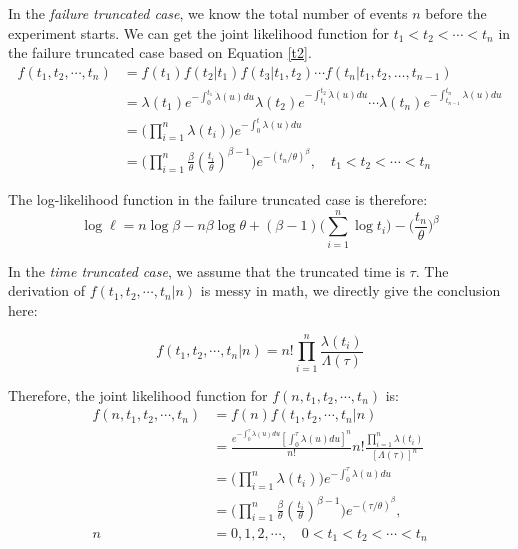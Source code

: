 \documentclass[12pt]{book}
\numberwithin{equation}{chapter}
\begin{document}
In the \emph{failure truncated case}, we know the total number of events \(n\) before the experiment starts. We can get the joint likelihood function for \(t_1 < t_2 < \cdots < t_n\) in the failure truncated case based on Equation \ref{t2}.
\begin{equation}\label{pdfn}
\begin{aligned}
f(t_1, t_2, \cdots, t_n) & = f(t_1)f(t_2|t_1)f(t_3|t_1, t_2) \cdots f(t_n|t_1, t_2, \dots, t_{n - 1}) \\
& = \lambda (t_1)e^{-\int_{0}^{t_1} \dot \lambda (u)du}\lambda (t_2)e^{-\int_{t_1}^{t_2} \dot \lambda (u)du}\cdots\lambda (t_n)e^{-\int_{t_{n-1}}^{t_n}\lambda (u)du}\\
& = \Big(\prod_{i=1}^n\lambda(t_i)\Big)e^{-\int_0^t\lambda(u)du}\\
& = \Big(\prod_{i=1}^n\frac{\beta}{\theta}(\frac{t_i}{\theta})^{\beta - 1}\Big)e^{-(t_n/\theta)^\beta}, \quad t_1 < t_2 < \cdots < t_n
\end{aligned}
\end{equation}

The log-likelihood function in the failure truncated case is therefore:
\[\log \ell = n\log\beta - n\beta\log\theta + (\beta - 1)\bigg(\sum_{i=1}^n\log t_i\bigg) - \Big(\frac{t_n}{\theta}\Big)^\beta\]

In the \emph{time truncated case}, we assume that the truncated time is \(\tau\). The derivation of \(f(t_1, t_2, \cdots, t_n|n)\) is messy in math, we directly give the conclusion here:

\[f(t_1, t_2, \cdots, t_n|n) = n!\prod_{i=1}^n\frac{\lambda(t_i)}{\Lambda(\tau)}\]

Therefore, the joint likelihood function for \(f(n, t_1, t_2, \cdots, t_n)\) is:
\begin{equation}\label{pdftau}
\begin{aligned}
f(n, t_1, t_2, \cdots, t_n) & = f(n)f(t_1, t_2, \cdots, t_n|n)\\
& = \frac{e^{-\int_0^\tau \lambda(u)du}[\int_0^\tau \lambda(u)du]^n}{n!}n!\frac{\prod_{i=1}^n\lambda(t_i)}{[\Lambda(\tau)]^n}\\
& = \Big(\prod_{i=1}^n\lambda(t_i) \Big)e^{-\int_0^\tau \lambda(u)du}\\
& = \Big(\prod_{i=1}^n\frac{\beta}{\theta}(\frac{t_i}{\theta})^{\beta - 1} \Big)e^{-(\tau/\theta)^\beta},\\ 
n & = 0, 1, 2, \cdots, \quad  0 < t_1 < t_2 < \cdots < t_n
\end{aligned}
\end{equation}
\end{document}
